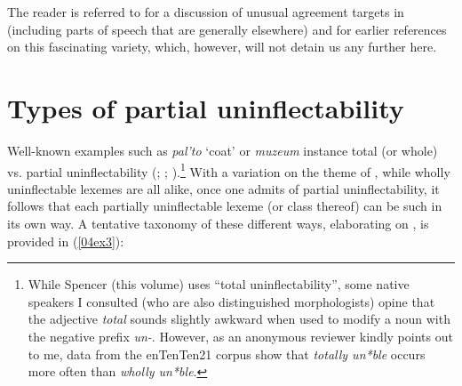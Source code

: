 \documentclass[output=paper,colorlinks,citecolor=brown]{langscibook}
\begin{document}

The reader is referred to \citet{paciaroni2023} for a discussion of unusual agreement targets in  (including parts of speech that are generally  elsewhere) and for earlier references on this fascinating variety, which, however, will not detain us any further here.

\largerpage[-1.5]

\section{Types of partial uninflectability} \label{04sec3}

Well-known examples such as  \emph{pal'to} `coat' or  \emph{muzeum} instance total (or whole) vs. partial uninflectability (\citealt[30]{baermanbrowncorbett2005}; \citealt[28]{baermanbrowncorbett2017}; \citealt[143]{spencer2020}).\footnote{While Spencer (this volume) uses ``total uninflectability'', some native  speakers I consulted (who are also distinguished morphologists) opine that the adjective \emph{total} sounds slightly awkward when used to modify a noun with the negative prefix \emph{un-}. However, as an anonymous reviewer kindly points out to me, data from the enTenTen21 corpus show that \emph{totally un*ble} occurs more often than \emph{wholly un*ble}.} With a variation on the theme of , while wholly uninflectable lexemes are all alike, once one admits of partial uninflectability, it follows that each partially uninflectable lexeme (or class thereof) can be such in its own way. A tentative taxonomy of these different ways, elaborating on \citet{spencer2020}, is provided in (\ref{04ex3}):
\end{document}
